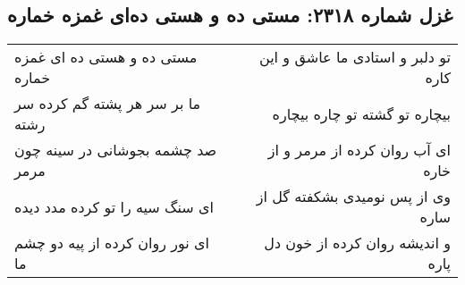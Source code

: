 \begin{center}
\section*{غزل شماره ۲۳۱۸: مستی ده و هستی ده‌ای غمزه خماره}
\label{sec:2318}
\begin{longtable}{l p{0.5cm} r}
مستی ده و هستی ده ای غمزه خماره
&&
تو دلبر و استادی ما عاشق و این کاره
\\
ما بر سر هر پشته گم کرده سر رشته
&&
بیچاره تو گشته تو چاره بیچاره
\\
صد چشمه بجوشانی در سینه چون مرمر
&&
ای آب روان کرده از مرمر و از خاره
\\
ای سنگ سیه را تو کرده مدد دیده
&&
وی از پس نومیدی بشکفته گل از ساره
\\
ای نور روان کرده از پیه دو چشم ما
&&
و اندیشه روان کرده از خون دل پاره
\\
\end{longtable}
\end{center}
